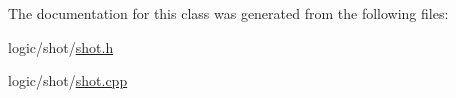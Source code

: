 The documentation for this class was generated from the following files\-:\begin{DoxyCompactItemize}
\item 
logic/shot/\hyperlink{shot_8h}{shot.\-h}\item 
logic/shot/\hyperlink{shot_8cpp}{shot.\-cpp}\end{DoxyCompactItemize}
